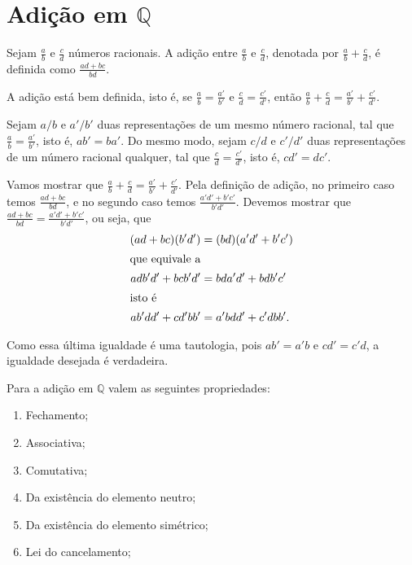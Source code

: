 \documentclass[../main.tex]{subfiles}
\begin{document}
\section{Adição em $\mathbb{Q}$}
\begin{defi}\label{rac-def-soma}
    Sejam $\frac{a}{b}$ e $\frac{c}{d}$ números racionais. A adição entre $\frac{a}{b}$ e $\frac{c}{d}$, denotada por $\frac{a}{b} + \frac{c}{d}$, é definida como $\frac{ad+bc}{bd}$.
\end{defi}
\begin{teo}\label{rac-teo-somaBemDefinida}
    A adição está bem definida, isto é, se $\frac{a}{b} = \frac{a'}{b'}$ e $\frac{c}{d} = \frac{c'}{d'}$, então 
    $\frac{a}{b} + \frac{c}{d} = \frac{a'}{b'} + \frac{c'}{d'}.$
\end{teo}
\begin{dem}
    Sejam $a/b$ e $a'/b'$ duas representações de um mesmo número racional, tal que $\frac{a}{b} = \frac{a'}{b'}$, isto é, $ab'=ba'$. Do mesmo modo, sejam $c/d$ e $c'/d'$ duas representações de um número racional qualquer, tal que $\frac{c}{d} = \frac{c'}{d'}$, isto é, $cd' = dc'$.
    
    Vamos mostrar que $\frac{a}{b} + \frac{c}{d} = \frac{a'}{b'} + \frac{c'}{d'}$.
    Pela definição de adição, no primeiro caso temos $\frac{ad+bc}{bd}$, e no segundo caso temos $\frac{a'd'+b'c'}{b'd'}$.
    Devemos mostrar que $\frac{ad+bc}{bd} = \frac{a'd'+b'c'}{b'd'}$, ou seja, que 
    \begin{align*}
        (ad+bc)(b'd') &= (bd)(a'd'+b'c') \\ \shortintertext{que equivale a}
        adb'd'+bcb'd' &= bda'd' + bdb'c' \\ \shortintertext{isto é}
        ab'dd' + cd'bb' &= a'bdd' + c'dbb'.
    \end{align*}
       
    Como essa última igualdade é uma tautologia, pois $ab' = a'b$ e $cd' = c'd$, a igualdade desejada é verdadeira.
\end{dem}
\begin{teo}\label{rac-teo-somaPropriedades}
    Para a adição em $\mathbb{Q}$ valem as seguintes propriedades:
    \begin{enumerate}[label=(\roman*)]
        \item Fechamento;
        \item Associativa;
        \item Comutativa;
        \item Da existência do elemento neutro; 
        \item Da existência do elemento simétrico;
        \item Lei do cancelamento;
    \end{enumerate}
\end{teo}
\end{document}
